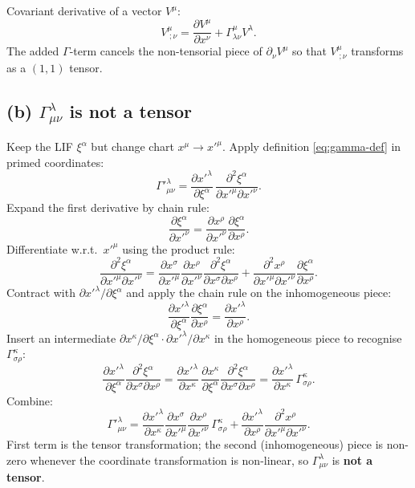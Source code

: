 \documentclass[11pt]{article}
\newcommand{\pd}[2]{\frac{\partial #1}{\partial #2}}
\begin{document}
Covariant derivative of a vector $V^\mu$:
\begin{equation}
\boxed{\;V^\mu_{\;;\nu} = \pd{V^\mu}{x^\nu} + \Gamma^\mu_{\lambda\nu} V^\lambda.\;}
\label{eq:covderiv}
\end{equation}
The added $\Gamma$-term cancels the non-tensorial piece of $\partial_\nu V^\mu$ so that $V^\mu_{\;;\nu}$ transforms as a $(1,1)$ tensor.

\subsection*{(b) $\Gamma^\lambda_{\mu\nu}$ is not a tensor}

Keep the LIF $\xi^\alpha$ but change chart $x^\mu \to x'^{\mu}$. Apply definition \eqref{eq:gamma-def} in primed coordinates:
\[ \Gamma'^\lambda_{\mu\nu} = \pd{x'^\lambda}{\xi^\alpha}\,\frac{\partial^2 \xi^\alpha}{\partial x'^\mu \partial x'^\nu}. \]
Expand the first derivative by chain rule:
\[ \pd{\xi^\alpha}{x'^\nu} = \pd{x^\rho}{x'^\nu}\pd{\xi^\alpha}{x^\rho}. \]
Differentiate w.r.t.\ $x'^\mu$ using the product rule:
\[ \frac{\partial^2 \xi^\alpha}{\partial x'^\mu \partial x'^\nu} = \pd{x^\sigma}{x'^\mu}\pd{x^\rho}{x'^\nu}\frac{\partial^2 \xi^\alpha}{\partial x^\sigma\partial x^\rho} + \frac{\partial^2 x^\rho}{\partial x'^\mu \partial x'^\nu}\pd{\xi^\alpha}{x^\rho}. \]
Contract with $\partial x'^\lambda/\partial\xi^\alpha$ and apply the chain rule on the inhomogeneous piece:
\[ \pd{x'^\lambda}{\xi^\alpha}\pd{\xi^\alpha}{x^\rho} = \pd{x'^\lambda}{x^\rho}. \]
Insert an intermediate $\partial x^\kappa/\partial\xi^\alpha\cdot\partial x'^\lambda/\partial x^\kappa$ in the homogeneous piece to recognise $\Gamma^\kappa_{\sigma\rho}$:
\[ \pd{x'^\lambda}{\xi^\alpha}\frac{\partial^2\xi^\alpha}{\partial x^\sigma\partial x^\rho} = \pd{x'^\lambda}{x^\kappa}\,\pd{x^\kappa}{\xi^\alpha}\frac{\partial^2\xi^\alpha}{\partial x^\sigma\partial x^\rho} = \pd{x'^\lambda}{x^\kappa}\,\Gamma^\kappa_{\sigma\rho}. \]
Combine:
\begin{equation}
\boxed{\;\Gamma'^\lambda_{\mu\nu} = \pd{x'^\lambda}{x^\kappa}\pd{x^\sigma}{x'^\mu}\pd{x^\rho}{x'^\nu}\,\Gamma^\kappa_{\sigma\rho} + \pd{x'^\lambda}{x^\rho}\frac{\partial^2 x^\rho}{\partial x'^\mu\partial x'^\nu}.\;}
\label{eq:gamma-transf}
\end{equation}
First term is the tensor transformation; the second (inhomogeneous) piece is non-zero whenever the coordinate transformation is non-linear, so $\Gamma^\lambda_{\mu\nu}$ is \textbf{not a tensor}.
\end{document}
